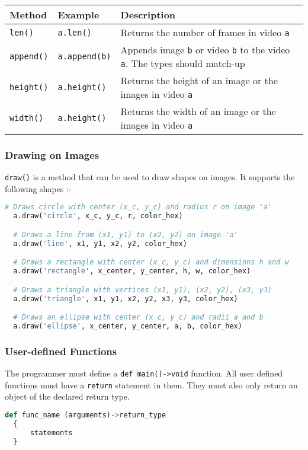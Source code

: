 \documentclass[a4paper, 11pt]{article}
\begin{document}
          \begin{tabular}{ |p{4cm}|p{5cm}|p{7cm}|  }
            \hline
            \textbf{Method} & \textbf{Example} & \textbf{Description}\\ 
            \hline
            \texttt{len()} & \texttt{a.len()} & Returns the number of frames in video \texttt{a} \\ \hline
            \texttt{append()} & \texttt{a.append(b)} & Appends image \texttt{b} or video \texttt{b} to the video \texttt{a}. The types should match-up \\ \hline
            \texttt{height()} & \texttt{a.height()} & Returns the height of an image or the images in video \texttt{a} \\ \hline
            \texttt{width()} & \texttt{a.height()} & Returns the width of an image or the images in video \texttt{a} \\ \hline
         \end{tabular}
             


          \subsubsection{Drawing on Images}
             \texttt{draw()} is a method that can be used to draw shapes on images. It supports the following shapes :-
             \begin{lstlisting}[language=Python]
  # Draws circle with center (x_c, y_c) and radius r on image 'a'
  a.draw('circle', x_c, y_c, r, color_hex)

  # Draws a line from (x1, y1) to (x2, y2) on image 'a'
  a.draw('line', x1, y1, x2, y2, color_hex)

  # Draws a rectangle with center (x_c, y_c) and dimensions h and w
  a.draw('rectangle', x_center, y_center, h, w, color_hex)

  # Draws a triangle with vertices (x1, y1), (x2, y2), (x3, y3)
  a.draw('triangle', x1, y1, x2, y2, x3, y3, color_hex)

  # Draws an ellipse with center (x_c, y_c) and radii a and b
  a.draw('ellipse', x_center, y_center, a, b, color_hex)\end{lstlisting}

                
          \subsubsection{User-defined Functions}
          The programmer must define a \texttt{def main()->void} function.
          All user defined functions must have a \texttt{return} statement in them. They must also only return an object of the declared return type.
            \begin{lstlisting}[language=Python]
  def func_name (arguments)->return_type
  {
      statements
  }\end{lstlisting}
\end{document}
